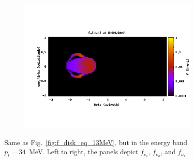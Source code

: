 \begin{figure}
\begin{subfigure}{.3\textwidth}
    \includegraphics[width=1\linewidth]{Figures/f_nux-E-34MeV}
  \end{subfigure}
  \caption[$f_\nu$ for the disk, from the equatorial plane: sky map at high energy]{
    Same as Fig.~\ref{fig:f_disk_eq_13MeV}, but in the energy band $p_t=34$~MeV.
    Left to right, the panels depict $f_{\nu_e}$, $f_{\nu_a}$, and $f_{\nu_x}$.
  }
  \label{fig:f_disk_eq_34MeV}
\end{figure}

